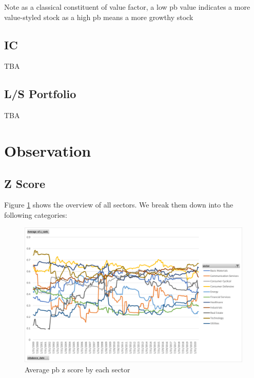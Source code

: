 \documentclass[11pt]{article} %
\begin{document}
Note as a classical constituent of value factor, a low pb value indicates a more value-styled stock as a high pb means a more growthy stock

\subsection{IC}
TBA


\subsection{L/S Portfolio}
TBA

\section{Observation}
\subsection{Z Score}
Figure \ref{fig:pb_z_sector} shows the overview of all sectors. We break them down into the following categories:

\begin{figure}[H]
\centering
\includegraphics[scale=0.7]{pb_z_score_sector.png}
\caption{Average pb z score by each sector}
\label{fig:pb_z_sector}
\end{figure}
\end{document}
